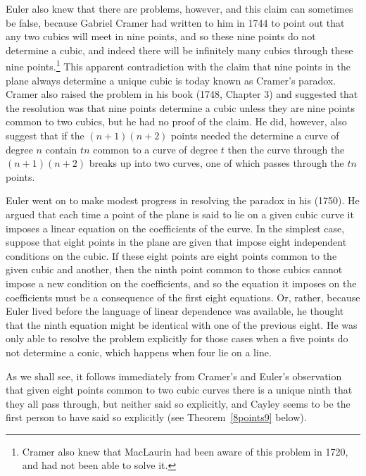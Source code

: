  Euler also knew that there are problems, however, and this claim can sometimes be false, because Gabriel Cramer had written to him in 1744 to point out that any two cubics will meet in nine points, and so these nine points do not determine a cubic, and indeed there will be infinitely many cubics through these nine points.\footnote{Cramer also knew that MacLaurin had been aware of this problem in 1720, and had not been able to solve it.} This apparent contradiction with the claim that nine points in the plane always determine a unique cubic is today known as Cramer's paradox. Cramer also raised the problem in his book (1748, Chapter 3) and suggested that the resolution was that  nine points determine a cubic unless they are nine points common to two cubics, but he had no proof of the claim. He did, however, also suggest that if the $ (n+1)(n+2)$ points needed the determine a curve of degree $n$ contain $tn$ common to a curve of degree $t$ then the curve through the  $ (n+1)(n+2)$ breaks up into two curves, one of which passes through the $tn$ points.

 Euler went on to make modest progress in resolving the paradox in his (1750). He argued that each time a point of the plane is said to lie on a given cubic curve it imposes a linear equation on the coefficients of the curve. In the simplest case, suppose that eight points in the plane are given that impose eight independent conditions on the cubic. If these eight points are eight points common to the given cubic and another, then the ninth point common to those cubics cannot impose a new condition on the coefficients, and so the equation it imposes on the coefficients must be a consequence of the first eight equations. Or, rather, because  Euler lived before the language of linear dependence was available, he thought that the ninth equation might be identical with one of the previous eight. He was only able to resolve the problem explicitly for those cases when a five points do not determine a conic, which happens when four lie on a line.

As we shall see, it follows immediately from Cramer's and   Euler's observation that given eight points common to two cubic curves there is a unique ninth that they all pass through, but neither  said so explicitly, and Cayley seems to be the first person to have said so explicitly (see Theorem~\ref{8points9} below).  

